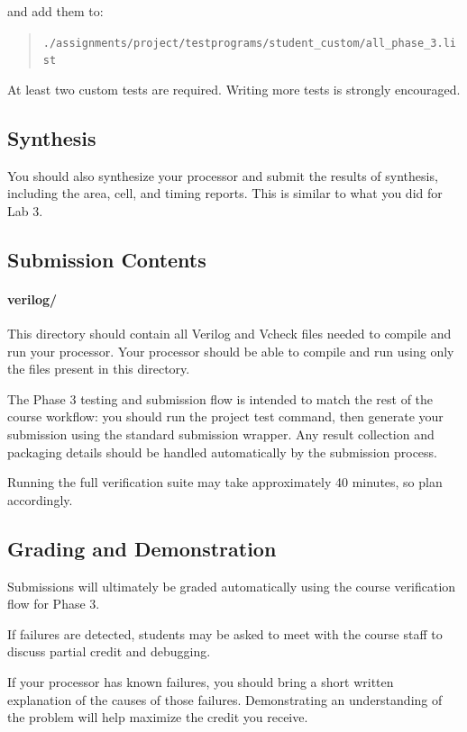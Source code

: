 \documentclass[12pt]{article}
\begin{document}
and add them to:

\begin{quote}
\texttt{./assignments/project/testprograms/student\_custom/all\_phase\_3.list}
\end{quote}

At least two custom tests are required.
Writing more tests is strongly encouraged.

\subsection*{Synthesis}
You should also synthesize your processor and submit the results of synthesis, including the
area, cell, and timing reports. This is similar to what you did for Lab 3.

\subsection*{Submission Contents}

\paragraph{verilog/}

This directory should contain all Verilog and Vcheck files needed to compile and run
your processor. Your processor should be able to compile and run using only the files
present in this directory.

The Phase 3 testing and submission flow is intended to match the rest of the
course workflow: you should run the project test command, then generate your
submission using the standard submission wrapper. Any result collection and
packaging details should be handled automatically by the submission process.

Running the full verification suite may take approximately 40 minutes, so plan accordingly.

\subsection*{Grading and Demonstration}

Submissions will ultimately be graded automatically using the course verification flow for Phase 3.

If failures are detected, students may be asked to meet with the course staff to discuss
partial credit and debugging.

If your processor has known failures, you should bring a short written explanation of
the causes of those failures. Demonstrating an understanding of the problem will help
maximize the credit you receive.
\end{document}
